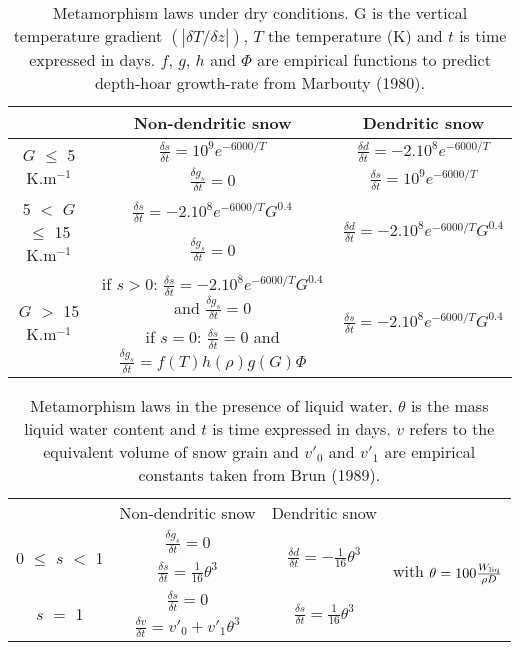 \begin{table}[t]
\caption{Metamorphism laws under dry conditions. G is the vertical temperature gradient $(|\delta T / \delta z|) $, $T$ the temperature (K) and $t$ is time expressed in days. $f$, $g$, $h$ and $\Phi$ are empirical functions to predict depth-hoar growth-rate from Marbouty (1980).}
\vskip4mm
\centering
\begin{tabular}{c|c|c}
\hline
&Non-dendritic snow &Dendritic snow \\
\hline
\multirow{2}{*}{ $G$ $\leq$ 5 K.m$^{-1}$} & $\frac{\delta s}{\delta t} = 10^9e^{-6000/T}$ & $\frac{\delta d}{\delta t} = -2.10^8e^{-6000/T}$ \\
& $\frac{\delta g_s}{\delta t} = 0$ &$\frac{\delta s}{\delta t} = 10^9e^{-6000/T}$ \\
\hline
\multirow{2}{*}{5 $<$ $G$ $\leq$ 15 K.m$^{-1}$} & $\frac{\delta s}{\delta t} = -2.10^8e^{-6000/T}G^{0.4}$ &\multirow{2}{*}{$\frac{\delta d}{\delta t} = -2.10^8e^{-6000/T} G^{0.4}$} \\
& $\frac{\delta g_s}{\delta t} = 0$ &\\
\cline{1-2}
\multirow{2}{*}{$G$ $>$ 15 K.m$^{-1}$} & if $s>$0: $\frac{\delta s}{\delta t} = -2.10^8e^{-6000/T}G^{0.4}$ and $\frac{\delta g_s}{\delta t} = 0$ & \multirow{2}{*}{$\frac{\delta s}{\delta t} = -2.10^8e^{-6000/T} G^{0.4}$} \\
& if $s=$0: $\frac{\delta s}{\delta t} = 0$ and $\frac{\delta g_s}{\delta t} = f(T)h(\rho)g(G)\Phi$ & \\
\hline
\end{tabular}
\label{tab_metamo_dry}
\end{table}

\begin{table}[t]
\caption{Metamorphism laws in the presence of liquid water. $\theta$ is the mass liquid water content and $t$ is time expressed in days. $v$ refers to the equivalent volume of snow grain and $v'_0$ and $v'_1$ are empirical constants taken from Brun (1989).}
\vskip4mm
\centering
\begin{tabular}{c|c|cc}
\cline{1-3}
\cline{1-3}
&Non-dendritic snow &Dendritic snow & \\
\cline{1-3}
\multirow{2}{*}{0 $\leq$ $s$ $<$ 1} & $\frac{\delta g_s}{\delta t} = 0$ & \multirow{2}{*}{ $\frac{\delta d}{\delta t} = -\frac{1}{16} \theta^3$ }&  \\
& $\frac{\delta s}{\delta t} = \frac{1}{16} \theta^3$ & &with $ \theta = 100\frac{W_{\rm liq}}{\rho D}$\\
\cline{1-2}
\multirow{2}{*}{$s$ $=$ 1} & $\frac{\delta s}{\delta t} = 0$ &\multirow{2}{*}{$\frac{\delta s}{\delta t} = \frac{1}{16} \theta^3$} &\\
& $\frac{\delta v}{\delta t} = v'_0+v'_1 \theta^3$ && \\
\cline{1-3}
\end{tabular}
\label{tab_metamo_wet}
\end{table}

